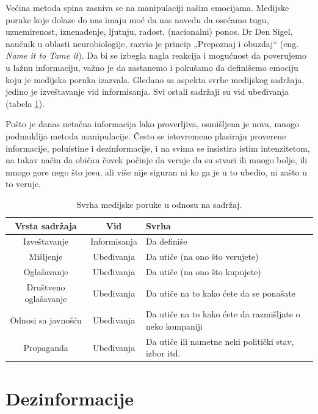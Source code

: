 \documentclass[a4paper]{article}
\begin{document}
Većina metoda spina zasniva se na manipulaciji našim emocijama. Medijske poruke koje dolaze do nas imaju moć da nas navedu da osećamo tugu, uznemirenost, iznenađenje, ljutnju, radost, (nacionalni) ponos. Dr Den Sigel, naučnik u oblasti neurobiologije, razvio je princip „Prepoznaj i obuzdaj“ \cite {nameittotameit} (eng. \emph{Name it to Tame it}). Da bi se izbegla nagla reakcija i mogućnost da poverujemo u lažnu informaciju, važno je da zastanemo i pokušamo da definišemo emociju koju je medijska poruka izazvala. Gledano sa aspekta svrhe medijskog sadržaja, jedino je izveštavanje vid informisanja. Svi ostali sadržaji su vid ubeđivanja (tabela \ref{tab:tabela1}). 

Pošto je danas netačna informacija lako proverljiva, osmišljena je nova, mnogo podmuklija metoda manipulacije. Često se istovremeno plasiraju proverene informacije, poluistine i  dezinformacije, i na svima se insistira istim intenzitetom, na takav način da običan čovek počinje da veruje da su stvari ili mnogo bolje, ili mnogo gore nego što jesu, ali više nije siguran ni ko ga je u to ubedio, ni zašto u to veruje.

\begin{table}[h!]
\begin{center}
\begin{tabular}{|c|c|p{3cm} |} \hline
Vrsta sadržaja& Vid& Svrha\\ \hline
Izveštavanje&Informisanja&Da definiše\\ \hline
Mišljenje &Ubeđivanja&Da utiče (na ono što verujete)\\ \hline
Oglašavanje &Ubeđivanja&Da utiče (na ono što kupujete)\\ \hline
Društveno oglašavanje &Ubeđivanja&Da utiče na to kako ćete da se ponašate\\ \hline
Odnosi sa javnošću &Ubeđivanja&Da utiče na to kako ćete da razmišljate o neko kompaniji\\ \hline
Propaganda &Ubeđivanja&Da utiče ili nametne neki politički stav, izbor itd.\\ \hline
\end{tabular}
\caption{ Svrha medijske poruke u odnosu na sadržaj.}
\label{tab:tabela1}
\end{center}
\end{table}

\newpage
\section{Dezinformacije}
\label{sec:naslovN}
\end{document}
